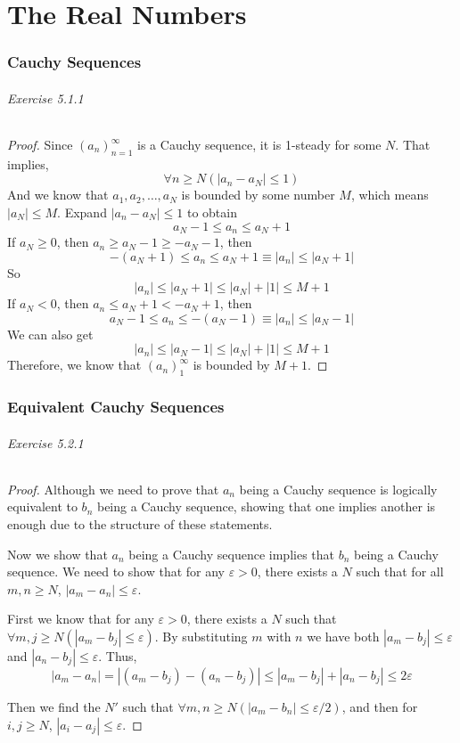 \newcommand{\sequence}[2]{(#1)^\infty_{n=#2}}

\part{The Real Numbers}

\section{Cauchy Sequences}
\paragraph{Exercise 5.1.1} \label{exercise5.1.1}
\begin{proof}
Since $(a_n)^\infty_{n=1}$ is a Cauchy sequence, it is 1-steady for some $N$. That implies,
\[
\forall n \geq N(|a_n-a_N| \leq 1)
\]
And we know that $a_1,a_2,\dots,a_N$ is bounded by some number $M$, which means $|a_N| \leq M$. Expand $|a_n-a_N| \leq 1$ to obtain
\[
a_N-1 \leq a_n \leq a_N+1
\]
If $a_N \geq 0$, then $a_n \geq a_N-1 \geq -a_N-1$, then
\[
-(a_N+1) \leq a_n \leq a_N+1 \equiv |a_n| \leq |a_N+1|
\]
So
\[
|a_n| \leq |a_N+1| \leq |a_N| + |1| \leq M+1
\]
If $a_N < 0$, then $a_n \leq a_N +1 < -a_N+1$, then
\[
a_N - 1 \leq a_n \leq -(a_N-1) \equiv |a_n| \leq |a_N-1|
\]
We can also get
\[
|a_n| \leq |a_N-1| \leq |a_N| + |1| \leq M+1
\]
Therefore, we know that $(a_n)^\infty_1$ is bounded by $M+1$.
\end{proof}

\section{Equivalent Cauchy Sequences}
\paragraph{Exercise 5.2.1} \label{exercise5.2.1}
\begin{proof}
Although we need to prove that $a_n$ being a Cauchy sequence is logically equivalent to $b_n$ being a Cauchy sequence, showing that one
implies another is enough due to the structure of these statements.

Now we show that $a_n$ being a Cauchy sequence implies that $b_n$ being a Cauchy sequence. We need to show that for any $\varepsilon >0$,
there exists a $N$ such that for all $m,n\geq N$, $|a_m-a_n| \leq \varepsilon$.

First we know that for any $\varepsilon >0$, there exists a $N$ such that $\forall m,j\geq N(|a_m-b_j|\leq \varepsilon)$. By substituting $m$
with $n$ we have both $|a_m-b_j|\leq \varepsilon$ and $|a_n-b_j|\leq \varepsilon$.
Thus,
\[
|a_m-a_n| = |(a_m-b_j) - (a_n-b_j)| \leq |a_m-b_j| + |a_n-b_j| \leq 2\varepsilon
\]

Then we find the $N'$ such that $\forall m,n\geq N(|a_m-b_n| \leq \varepsilon/2)$, and then for $i,j \geq N$, $|a_i-a_j| \leq \varepsilon$.
\end{proof}

